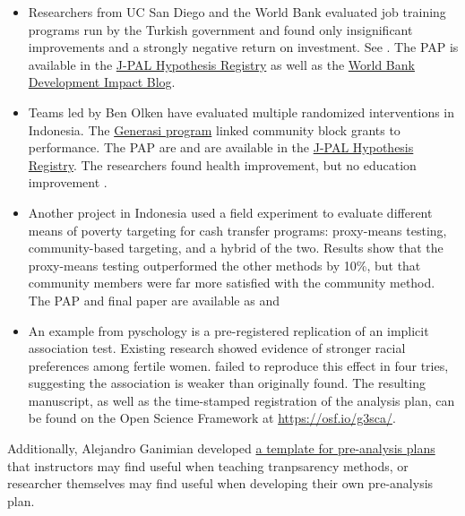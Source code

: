 \documentclass[12pt] {article}
\begin{document}
\begin{itemize}
\item
Researchers from UC San Diego and the World Bank evaluated job training programs run by the Turkish government and found only insignificant improvements and a strongly negative return on investment. See \cite{almeida_impact_2012, vocationalTurkey}. The PAP is available in the \href{http://www.povertyactionlab.org/Hypothesis-Registry}{J-PAL Hypothesis Registry} as well as the \href{http://blogs.worldbank.org/impactevaluations/files/impactevaluations/iskurie_analysisplan_v4a.pdf}{World Bank Development Impact Blog}.



\item 
Teams led by Ben Olken have evaluated multiple randomized interventions in Indonesia. The \href{http://www.povertyactionlab.org/evaluation/project-generasi-conditional-community-block-grants-indonesia}{Generasi program} linked community block grants to performance. The PAP are \cite{olken_generasi_2009, olken_generasi_2010} and are available in the \href{http://www.povertyactionlab.org/Hypothesis-Registry}{J-PAL Hypothesis Registry}. The researchers found health improvement, but no education improvement \citep{olken_indonesias_2010, olken_should_2014}.

\item 
Another project in Indonesia used a field experiment to evaluate different means of poverty targeting for cash transfer programs: proxy-means testing, community-based targeting, and a hybrid of the two. Results show that the proxy-means testing outperformed the other methods by 10\%, but that community members were far more satisfied with the community method. The PAP and final paper are available as \cite{olken_targeting_2009} and \cite{alatas_targeting_2012}

\item
An example from pyschology is a pre-registered replication of an implicit association test. Existing research showed evidence of stronger racial preferences among fertile women. \cite{NosekPreRegistered} failed to reproduce this effect in four tries, suggesting the association is weaker than originally found. The resulting manuscript, as well as the time-stamped registration of the analysis plan, can be found on the Open Science Framework at \url{https://osf.io/g3sca/}.
\end{itemize}
Additionally, Alejandro Ganimian developed \href{http://scholar.harvard.edu/files/alejandro_ganimian/files/pre-analysis_plan_template_0.pdf}{a template for pre-analysis plans} that instructors may find useful when teaching tranpsarency methods, or researcher themselves may find useful when developing their own pre-analysis plan.
\end{document}
